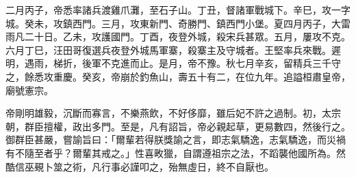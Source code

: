 \begin{pinyinscope}
 二月丙子，帝悉率諸兵渡雞爪灘，至石子山。丁丑，督諸軍戰城下。辛巳，攻一字城。癸未，攻鎮西門。三月，攻東新門、奇勝門、鎮西門小堡。夏四月丙子，大雷雨凡二十日。乙未，攻護國門。丁酉，夜登外城，殺宋兵甚眾。五月，屢攻不克。六月丁巳，汪田哥復選兵夜登外城馬軍寨，殺寨主及守城者。王堅率兵來戰。遲明，遇雨，梯折，後軍不克進而止。是月，帝不豫。秋七月辛亥，留精兵三千守之，餘悉攻重慶。癸亥，帝崩於釣魚山，壽五十有二，在位九年。追謚桓肅皇帝，廟號憲宗。



 帝剛明雄毅，沉斷而寡言，不樂燕飲，不好侈靡，雖后妃不許之過制。初，太宗朝，群臣擅權，政出多門。至是，凡有詔旨，帝必親起草，更易數四，然後行之。御群臣甚嚴，嘗諭旨曰：「爾輩若得朕獎諭之言，即志氣驕逸，志氣驕逸，而災禍有不隨至者乎？爾輩其戒之。」性喜畋獵，自謂遵祖宗之法，不蹈襲他國所為。然酷信巫覡卜筮之術，凡行事必謹叩之，殆無虛日，終不自厭也。



\end{pinyinscope}